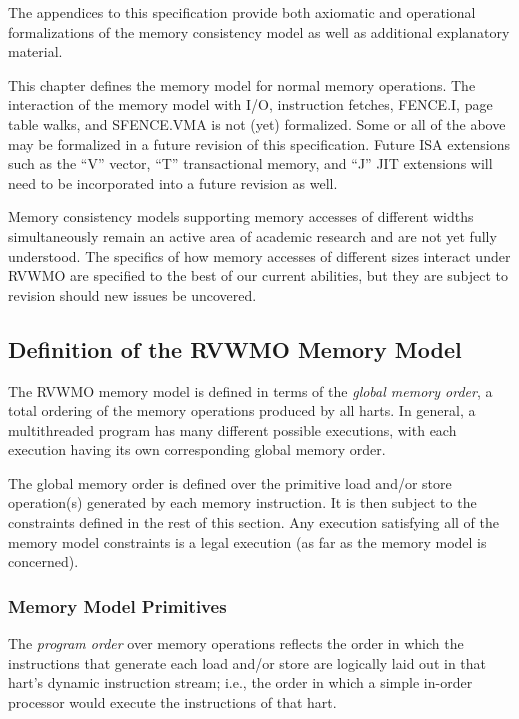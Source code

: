 The appendices to this specification provide both axiomatic and operational formalizations of the memory consistency model as well as additional explanatory material.

\begin{commentary}
  This chapter defines the memory model for normal memory operations.  The interaction of the memory model with I/O, instruction fetches, FENCE.I, page table walks, and SFENCE.VMA is not (yet) formalized.  Some or all of the above may be formalized in a future revision of this specification.  Future ISA extensions such as the ``V'' vector, ``T'' transactional memory, and ``J'' JIT extensions will need to be incorporated into a future revision as well.

  Memory consistency models supporting memory accesses of different widths simultaneously remain an active area of academic research and are not yet fully understood.  The specifics of how memory accesses of different sizes interact under RVWMO are specified to the best of our current abilities, but they are subject to revision should new issues be uncovered.
\end{commentary}

\subsection*{Definition of the RVWMO Memory Model}
\label{sec:rvwmo}

The RVWMO memory model is defined in terms of the {\em global memory order}, a total ordering of the memory operations produced by all harts.
In general, a multithreaded program has many different possible executions, with each execution having its own corresponding global memory order.

The global memory order is defined over the primitive load and/or store operation(s) generated by each memory instruction.
It is then subject to the constraints defined in the rest of this section.
Any execution satisfying all of the memory model constraints is a legal execution (as far as the memory model is concerned).

\subsubsection*{Memory Model Primitives}
\label{sec:rvwmo:primitives}
The {\em program order} over memory operations reflects the order in which the instructions that generate each load and/or store are logically laid out in that hart's dynamic instruction stream; i.e., the order in which a simple in-order processor would execute the instructions of that hart.


